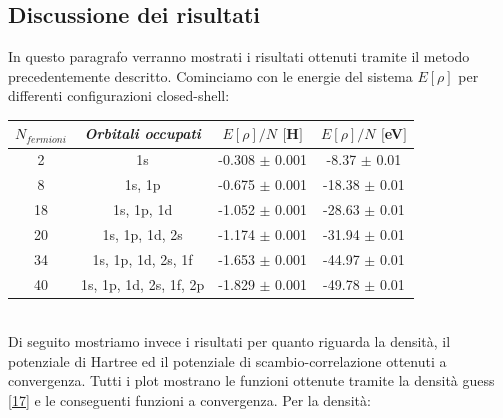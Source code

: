 \documentclass[11pt,a4paper]{article}
\begin{document}
\subsection{Discussione dei risultati}
In questo paragrafo verranno mostrati i risultati ottenuti tramite il metodo precedentemente descritto. Cominciamo con le energie del sistema $E[\rho]$ per differenti configurazioni closed-shell:
\begin{center}
\begin{tabular}{|c|c|c|c|}
\hline
$N_{fermioni}$ & \emph{Orbitali occupati} & $E[\rho]/N$ $[$H$]$ & $E[\rho]/N$ $[$eV$]$ \\ \hline
2 & 1s & -0.308 $\pm$ 0.001 & -8.37 $\pm$ 0.01 \\ \hline
8 & 1s, 1p & -0.675 $\pm$ 0.001 & -18.38 $\pm$ 0.01 \\ \hline
18 & 1s, 1p, 1d & -1.052 $\pm$ 0.001 & -28.63 $\pm$ 0.01 \\ \hline
20 & 1s, 1p, 1d, 2s & -1.174 $\pm$ 0.001 & -31.94 $\pm$ 0.01 \\ \hline
34 & 1s, 1p, 1d, 2s, 1f & -1.653 $\pm$ 0.001 & -44.97 $\pm$ 0.01 \\ \hline
40 & 1s, 1p, 1d, 2s, 1f, 2p & -1.829 $\pm$ 0.001 & -49.78 $\pm$ 0.01 \\ \hline
\end{tabular}
\end{center}\ \\
Di seguito mostriamo invece i risultati per quanto riguarda la densità, il potenziale di Hartree ed il potenziale di scambio-correlazione ottenuti a convergenza. Tutti i plot mostrano le funzioni ottenute tramite la densità guess \eqref{17} e le conseguenti funzioni a convergenza. Per la densità:
\newpage
\end{document}
